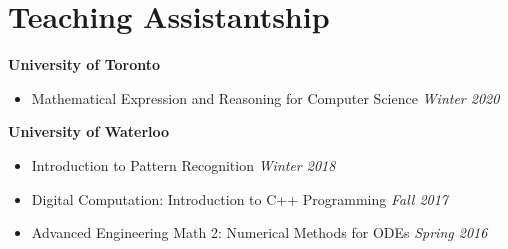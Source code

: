 \section*{Teaching Assistantship}
    \vspace{\postsubhead}
    \textbf{University of Toronto}
      \begin{itemize}
        \item Mathematical Expression and Reasoning for Computer Science
          \hfill
      	 \textit{Winter 2020}
      \end{itemize}
    \textbf{University of Waterloo}
      \begin{itemize}
        \item Introduction to Pattern Recognition
          \hfill
      	 \textit{Winter 2018}
      \end{itemize}
	
      \begin{itemize}
        \item Digital Computation: Introduction to C++ Programming
          \hfill
      	 \textit{Fall 2017}

      \end{itemize}
      \begin{itemize}
        \item Advanced Engineering Math 2: Numerical Methods for ODEs
          \hfill
      	 \textit{Spring 2016}
      \end{itemize}
   \vspace{\interlist}
   
